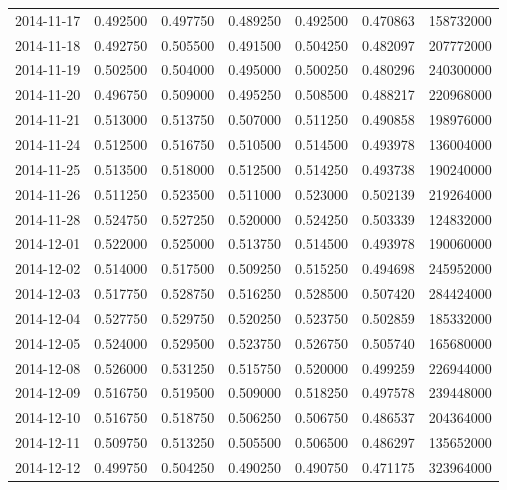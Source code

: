 \begin{tabular}{lrrrrrr}
2014-11-17 &    0.492500 &    0.497750 &    0.489250 &    0.492500 &    0.470863 &   158732000 \\
2014-11-18 &    0.492750 &    0.505500 &    0.491500 &    0.504250 &    0.482097 &   207772000 \\
2014-11-19 &    0.502500 &    0.504000 &    0.495000 &    0.500250 &    0.480296 &   240300000 \\
2014-11-20 &    0.496750 &    0.509000 &    0.495250 &    0.508500 &    0.488217 &   220968000 \\
2014-11-21 &    0.513000 &    0.513750 &    0.507000 &    0.511250 &    0.490858 &   198976000 \\
2014-11-24 &    0.512500 &    0.516750 &    0.510500 &    0.514500 &    0.493978 &   136004000 \\
2014-11-25 &    0.513500 &    0.518000 &    0.512500 &    0.514250 &    0.493738 &   190240000 \\
2014-11-26 &    0.511250 &    0.523500 &    0.511000 &    0.523000 &    0.502139 &   219264000 \\
2014-11-28 &    0.524750 &    0.527250 &    0.520000 &    0.524250 &    0.503339 &   124832000 \\
2014-12-01 &    0.522000 &    0.525000 &    0.513750 &    0.514500 &    0.493978 &   190060000 \\
2014-12-02 &    0.514000 &    0.517500 &    0.509250 &    0.515250 &    0.494698 &   245952000 \\
2014-12-03 &    0.517750 &    0.528750 &    0.516250 &    0.528500 &    0.507420 &   284424000 \\
2014-12-04 &    0.527750 &    0.529750 &    0.520250 &    0.523750 &    0.502859 &   185332000 \\
2014-12-05 &    0.524000 &    0.529500 &    0.523750 &    0.526750 &    0.505740 &   165680000 \\
2014-12-08 &    0.526000 &    0.531250 &    0.515750 &    0.520000 &    0.499259 &   226944000 \\
2014-12-09 &    0.516750 &    0.519500 &    0.509000 &    0.518250 &    0.497578 &   239448000 \\
2014-12-10 &    0.516750 &    0.518750 &    0.506250 &    0.506750 &    0.486537 &   204364000 \\
2014-12-11 &    0.509750 &    0.513250 &    0.505500 &    0.506500 &    0.486297 &   135652000 \\
2014-12-12 &    0.499750 &    0.504250 &    0.490250 &    0.490750 &    0.471175 &   323964000 \\

\end{tabular}
